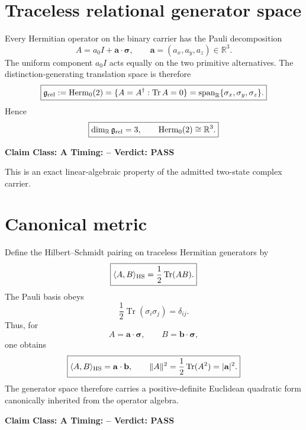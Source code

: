 \documentclass[11pt,a4paper,twoside]{book}
\theoremstyle{definition}
\newcommand{\vTwelveStatus}[3]{\par\noindent\textbf{Claim Class: #1 \quad Timing: #2 \quad Verdict: #3}\par}
\begin{document}
\section{Traceless relational generator space}

Every Hermitian operator on the binary carrier has the Pauli decomposition
\begin{equation}
A=a_0I+\mathbf a\cdot\boldsymbol\sigma,
\qquad
\mathbf a=(a_x,a_y,a_z)\in\mathbb R^3.
\end{equation}
The uniform component $a_0I$ acts equally on the two primitive alternatives. The distinction-generating translation space is therefore
\begin{equation}
\boxed{
\mathfrak g_{\rm rel}
:=\operatorname{Herm}_0(2)
=\{A=A^\dagger:\operatorname{Tr}A=0\}
=\operatorname{span}_{\mathbb R}\{\sigma_x,\sigma_y,\sigma_z\}.
}
\label{eq:v12_herm0_def}
\end{equation}
Hence
\begin{equation}
\boxed{
\dim_{\mathbb R}\mathfrak g_{\rm rel}=3,
\qquad
\operatorname{Herm}_0(2)\cong\mathbb R^3.
}
\label{eq:v12_herm0_r3}
\end{equation}
\vTwelveStatus{A}{--}{PASS}
This is an exact linear-algebraic property of the admitted two-state complex carrier.

\section{Canonical metric}

Define the Hilbert--Schmidt pairing on traceless Hermitian generators by
\begin{equation}
\boxed{
\langle A,B\rangle_{\rm HS}
=\frac12\operatorname{Tr}(AB).
}
\label{eq:v12_hs_metric}
\end{equation}
The Pauli basis obeys
\begin{equation}
\frac12\operatorname{Tr}(\sigma_i\sigma_j)=\delta_{ij}.
\end{equation}
Thus, for
\[
A=\mathbf a\cdot\boldsymbol\sigma,
\qquad
B=\mathbf b\cdot\boldsymbol\sigma,
\]
one obtains
\begin{equation}
\boxed{
\langle A,B\rangle_{\rm HS}=\mathbf a\cdot\mathbf b,
\qquad
\|A\|^2=\frac12\operatorname{Tr}(A^2)=|\mathbf a|^2.
}
\label{eq:v12_hs_euclidean}
\end{equation}
The generator space therefore carries a positive-definite Euclidean quadratic form canonically inherited from the operator algebra.
\vTwelveStatus{A}{--}{PASS}
\end{document}
